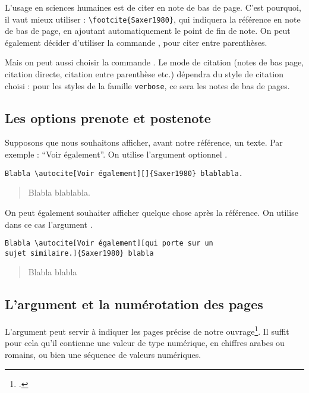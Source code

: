 L'usage en sciences humaines est de citer en note de bas de page. C'est pourquoi, il vaut mieux utiliser : \verb|\footcite{Saxer1980}|, qui indiquera la référence en note de bas de page, en ajoutant automatiquement le point de fin de note. On peut également décider d'utiliser la commande , pour citer entre parenthèses. 

Mais on peut aussi choisir la commande . Le mode de citation (notes de bas page, citation directe, citation entre parenthèse etc.) dépendra du style de citation choisi : pour les styles de la famille \verb|verbose|, ce sera les notes de bas de pages. 

\subsection{Les options prenote et postenote}

Supposons que nous souhaitons afficher, avant notre référence, un texte. Par exemple : \enquote{Voir également}. On utilise l'argument optionnel .

\begin{verbatim}
Blabla \autocite[Voir également][]{Saxer1980} blablabla.
\end{verbatim}

\begin{quotation}
Blabla \parencite[Voir également][]{Saxer1980} blablabla.
\end{quotation}



On peut également souhaiter afficher quelque chose après la référence. On utilise dans ce cas l'argument .

\begin{verbatim}
Blabla \autocite[Voir également][qui porte sur un
sujet similaire.]{Saxer1980} blabla
\end{verbatim}

\begin{quotation}

	Blabla \parencite[Voir également][qui porte sur un sujet similaire.]{Saxer1980} blabla
\end{quotation}

\subsection{L'argument  et la numérotation des pages}

L'argument  peut servir à indiquer les pages précise de notre ouvrage\footcite[On consultera pour plus de détails : ][]{biblatex_pages}. Il suffit pour cela qu'il contienne une valeur de type numérique, en chiffres arabes ou romains, ou bien une séquence de valeurs numériques.


